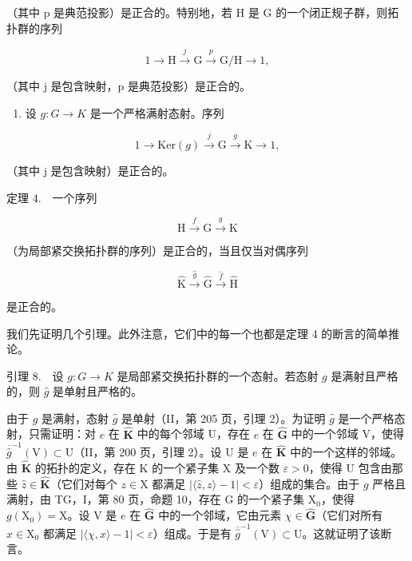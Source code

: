 （其中 p 是典范投影）是正合的。特别地，若 H 是 G 的一个闭正规子群，则拓扑群的序列

\[
1 \to \mathrm{H} \xrightarrow {j} \mathrm{G} \xrightarrow {p} \mathrm{G} / \mathrm{H} \to 1,
\]

（其中 j 是包含映射，p 是典范投影）是正合的。

\begin{enumerate}
\def\labelenumi{\arabic{enumi})}
\setcounter{enumi}{1}
\tightlist
\item
  设 \(g: G \rightarrow K\) 是一个严格满射态射。序列
\end{enumerate}

\[
1 \to \mathrm{Ker} (g) \stackrel {j} {\longrightarrow} \mathrm{G} \stackrel {g} {\longrightarrow} \mathrm{K} \to 1,
\]

（其中 j 是包含映射）是正合的。

定理 4.　一个序列

\[
\mathrm{H} \xrightarrow {f} \mathrm{G} \xrightarrow {g} \mathrm{K}
\]

（为局部紧交换拓扑群的序列）是正合的，当且仅当对偶序列

\[
\widehat {\mathrm{K}} \xrightarrow {\widehat {g}} \widehat {\mathrm{G}} \xrightarrow {\widehat {f}} \widehat {\mathrm{H}}
\]

是正合的。

我们先证明几个引理。此外注意，它们中的每一个也都是定理 4 的断言的简单推论。

引理 8.　设 \(g \colon G \to K\) 是局部紧交换拓扑群的一个态射。若态射 \(g\) 是满射且严格的，则 \(\widehat{g}\) 是单射且严格的。

由于 \(g\) 是满射，态射 \(\widehat{g}\) 是单射（II，第 205 页，引理 2）。为证明 \(\widehat{g}\) 是一个严格态射，只需证明：对 \(e\) 在 \(\widehat{\mathbf{K}}\) 中的每个邻域 U，存在 \(e\) 在 \(\widehat{\mathbf{G}}\) 中的一个邻域 V，使得 \(\overline{\widehat{g}}^{-1} (\mathrm{V})\subset \mathrm{U}\)（II，第 200 页，引理 2）。设 U 是 \(e\) 在 \(\widehat{\mathbf{K}}\) 中的一个这样的邻域。由 \(\widehat{\mathbf{K}}\) 的拓扑的定义，存在 K 的一个紧子集 X 及一个数 \(\varepsilon >0\)，使得 U 包含由那些 \(\widehat{z}\in \widehat{\mathbf{K}}\)（它们对每个 \(z\in \mathrm{X}\) 都满足 \(|\langle \widehat{z},z\rangle -1| < \varepsilon\)）组成的集合。由于 \(g\) 严格且满射，由 TG，I，第 80 页，命题 10，存在 G 的一个紧子集 \(\mathrm{X}_0\)，使得 \(g(\mathrm{X}_0) = \mathrm{X}\)。设 V 是 \(e\) 在 \(\widehat{\mathbf{G}}\) 中的一个邻域，它由元素 \(\chi \in \widehat{\mathbf{G}}\)（它们对所有 \(x\in \mathrm{X}_0\) 都满足 \(|\langle \chi ,x\rangle -1| < \varepsilon\)）组成。于是有 \(\overline{\widehat{g}}^{-1} (\mathrm{V})\subset \mathrm{U}\)。这就证明了该断言。

